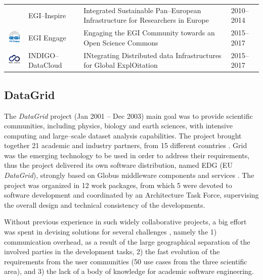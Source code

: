 \documentclass[journal]{IEEEtran}
\begin{document}
\begin{table}[!h]
\begin{tabular}{p{1.6cm}p{1.5cm}p{3cm}l}
\begin{minipage}{.3\textwidth}
\end{minipage}
     & EGI--Inspire &
Integrated Sustainable Pan--European Infrastructure for Researchers in Europe
 & 2010--2014\\
\begin{minipage}{.3\textwidth}
\includegraphics[width=15mm,height=7.5mm]{images/egi_engage}
\end{minipage}
     & EGI Engage &
Engaging the EGI Community towards an Open Science Commons
 & 2015--2017\\
\begin{minipage}{.3\textwidth}
\includegraphics[width=15mm,height=7.5mm]{images/indigo}
\end{minipage}
     & INDIGO--DataCloud &
INtegrating Distributed data Infrastructures for Global ExplOitation
 & 2015--2017\\
\hline
\hline
\end{tabular}
\end{table}

\subsection{DataGrid}

The {\sl DataGrid} \cite{cordis:datagrid} project (Jan 2001 -- Dec 2003)
main goal was to provide scientific communities, including physics, biology and
earth sciences, with intensive computing and large--scale dataset analysis capabilities.
The project brought together 21 academic and industry partners, from 15 different countries \cite{gagliardi}.
Grid was the emerging technology to be used in order to address their requirements,
thus the project delivered its own software distribution, named EDG (EU {\sl DataGrid}), strongly
based on Globus middleware components and services \cite{globus}. The project was organized in 12 work packages, from
which 5 were devoted to software development and coordinated by an
Architecture Task Force, supervising the overall design and technical consistency
of the developments.

Without previous experience in such widely
collaborative projects, a big effort was spent in devising solutions for several
challenges \cite{datagrid}, namely the 1) communication overhead, as a
result of the large geographical separation of the involved parties in the
development tasks, 2) the fast evolution of the requirements from the user
communities (50 use cases from the three scientific area), and 3) the lack of a body
of knowledge for academic software engineering.
\end{document}
